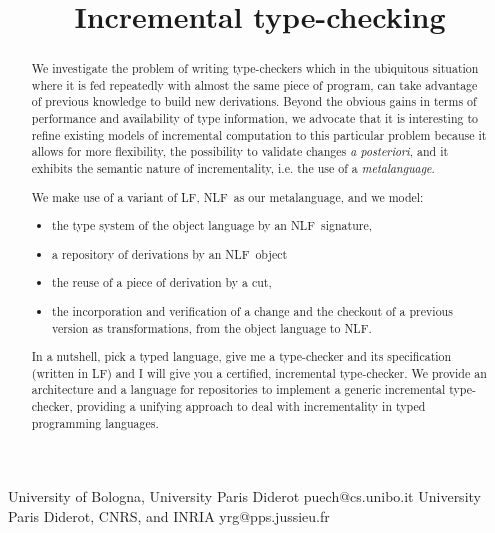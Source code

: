 \documentclass[preprint]{sigplanconf}
\newcommand\lang[1]{\textsf{#1}}
\newcommand\LF{\lang{LF}}
\newcommand\NLF{\lang{NLF}}
\begin{document}
\copyrightdata{[to be supplied]}


\title{Incremental type-checking}

           {University of Bologna, University Paris Diderot}
           {puech@cs.unibo.it}
           {University Paris Diderot, CNRS, and INRIA}
           {yrg@pps.jussieu.fr}

\maketitle

\begin{abstract}
  We investigate the problem of writing type-checkers which in the
  ubiquitous situation where it is fed repeatedly with almost the same
  piece of program, can take advantage of previous knowledge to build
  new derivations.
  Beyond the obvious gains in terms of performance and availability of
  type information, we advocate that it is interesting to refine
  existing models of incremental computation to this particular
  problem because it allows for more flexibility, the possibility to
  validate changes \emph{a posteriori}, and it exhibits the semantic
  nature of incrementality, i.e. the use of a \emph{metalanguage}.

  We make use of a variant of \LF, \NLF\ as our metalanguage, and we
  model:
  \begin{itemize}
  \item the type system of the object language by an \NLF\ signature,
  \item a repository of derivations by an \NLF\ object
  \item the reuse of a piece of derivation by a cut,
  \item the incorporation and verification of a change and the
    checkout of a previous version as transformations, from the object
    language to \NLF.
  \end{itemize}
  In a nutshell, pick a typed language, give me a type-checker and its
  specification (written in \LF) and I will give you a certified,
  incremental type-checker. 
  We provide an architecture and a language
  for repositories to implement a generic incremental type-checker,
  providing a unifying approach to deal with incrementality in typed
  programming languages.
\end{abstract}
\vfill
\end{document}
